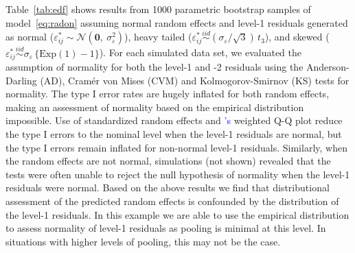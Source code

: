 \documentclass[12pt]{article} %
\newcommand{\citetapos}[1]{\citeauthor{#1}{\textcolor{blue}{'s}} }
\newcommand{\al}[1]{{\color{red} #1}}
\begin{document}


Table~\ref{tab:edf} shows results from 1000 parametric bootstrap samples of model~\eqref{eq:radon} assuming normal random effects and level-1 residuals generated as normal ($\varepsilon_{ij}^* \sim \mathcal{N}(\bm{0},\ \sigma^2_\varepsilon)$), heavy tailed ($\varepsilon_{ij}^* \overset{iid}{\sim} (\sigma_{\varepsilon} / \sqrt{3})\, t_3$), and skewed ($\varepsilon_{ij}^* \overset{iid}{\sim} \sigma_{\varepsilon} \, \{ \text{Exp}(1) - 1 \}$).
For each simulated data set, we evaluated the assumption of normality for both the level-1 and -2 residuals using the Anderson-Darling (AD), Cram{\'e}r von Mises (CVM) and  Kolmogorov-Smirnov (KS) tests for normality.  
The type I error rates are hugely inflated for both random effects, making an assessment of normality based on the empirical distribution impossible. Use of standardized random effects and \citetapos{Lange:1989uu} weighted Q-Q plot reduce the type I errors to the nominal level when the level-1 residuals are normal, but the type I errors remain inflated for non-normal level-1 residuals. Similarly, when the random effects are not normal, simulations (not shown) revealed that the tests were  often unable to reject the null hypothesis of normality when the level-1 residuals were normal. \al{Based on the above results we find that distributional assessment of the predicted random effects is confounded by the distribution of the level-1 residuals.}
In this example we are able to use the empirical distribution to assess normality of  level-1 residuals  as  pooling is minimal at this level. In situations with higher levels of pooling, this may not be the case.
\end{document}
